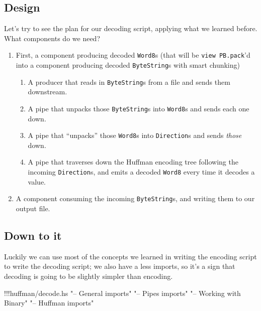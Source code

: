 \documentclass[]{article}
\newenvironment{Shaded}{}{}
\newcommand{\StringTok}[1]{\textcolor[rgb]{0.25,0.44,0.63}{{#1}}}
\newcommand{\FunctionTok}[1]{\textcolor[rgb]{0.02,0.16,0.49}{{#1}}}
\newcommand{\NormalTok}[1]{{#1}}
\begin{document}
\subsection{Design}\label{design-1}

Let's try to see the plan for our decoding script, applying what we
learned before. What components do we need?

\begin{enumerate}
\def\labelenumi{\arabic{enumi}.}
\tightlist
\item
  First, a component producing decoded \texttt{Word8}s (that will be
  \texttt{view\ PB.pack}'d into a component producing decoded
  \texttt{ByteString}s with smart chunking)

  \begin{enumerate}
  \def\labelenumii{\arabic{enumii}.}
  \tightlist
  \item
    A producer that reads in \texttt{ByteString}s from a file and sends
    them downstream.
  \item
    A pipe that unpacks those \texttt{ByteString}s into \texttt{Word8}s
    and sends each one down.
  \item
    A pipe that ``unpacks'' those \texttt{Word8}s into
    \texttt{Direction}s and sends \emph{those} down.
  \item
    A pipe that traverses down the Huffman encoding tree following the
    incoming \texttt{Direction}s, and emits a decoded \texttt{Word8}
    every time it decodes a value.
  \end{enumerate}
\item
  A component consuming the incoming \texttt{ByteString}s, and writing
  them to our output file.
\end{enumerate}

\subsection{Down to it}\label{down-to-it-1}

Luckily we can use most of the concepts we learned in writing the
encoding script to write the decoding script; we also have a less
imports, so it's a sign that decoding is going to be slightly simpler
than encoding.

\begin{Shaded}
\begin{Highlighting}[]
\FunctionTok{!!!}\NormalTok{huffman}\FunctionTok{/}\NormalTok{decode}\FunctionTok{.}\NormalTok{hs }\StringTok{"-- General imports"} \StringTok{"-- Pipes imports"} \StringTok{"-- Working with Binary"} \StringTok{"-- Huffman imports"}
\end{Highlighting}
\end{Shaded}
\end{document}
